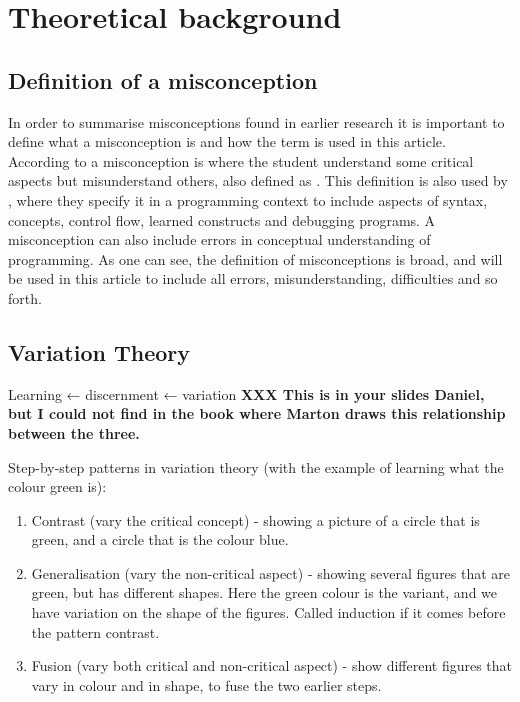 \section{Theoretical background}

\subsection{Definition of a misconception}

In order to summarise misconceptions found in earlier research it is 
important to define what a misconception is and how the term is used in this 
article. According to \textcite{NCOL} a misconception is where the student 
understand some critical aspects but misunderstand others, also defined as 
. This definition is also used by 
\textcite{MisconceptionsSurvey2017}, where they specify it in a programming 
context to include aspects of syntax, concepts, control flow, learned 
constructs and debugging programs. A misconception can also include errors 
in 
conceptual understanding of programming. As one can see, the definition of 
misconceptions is broad, and will be used in this article to include all 
errors, misunderstanding, difficulties and so forth. 

\subsection{Variation Theory}

Learning ← discernment ← variation \textbf{XXX This is in your slides 
Daniel, but I could not find in the book where Marton draws this 
relationship between the three.}

Step-by-step patterns in variation theory (with the example of learning 
what the colour green is):

\begin{enumerate}
    \item Contrast (vary the critical concept) - showing a picture of a 
circle that is green, and a circle that is the colour blue.
    \item Generalisation (vary the non-critical aspect) - showing several 
figures that are green, but has different shapes. Here the green colour 
is the variant, and we have variation on the shape of the figures. 
Called induction if it comes before the pattern contrast.
    \item Fusion (vary both critical and non-critical aspect) - show 
different figures that vary in colour and in shape, to fuse the two 
earlier steps.
\end{enumerate}

